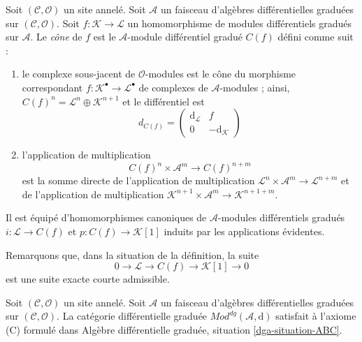 \begin{definition}
\label{definition-cone}
Soit $(\mathcal{C}, \mathcal{O})$ un site annelé.
Soit $\mathcal{A}$ un faisceau d'algèbres différentielles graduées sur $(\mathcal{C}, \mathcal{O})$.
Soit $f : \mathcal{K} \to \mathcal{L}$ un homomorphisme de modules différentiels gradués sur $\mathcal{A}$.
Le {\it cône} de $f$ est le $\mathcal{A}$-module différentiel gradué $C(f)$ défini comme suit :
\begin{enumerate}
\item le complexe sous-jacent de $\mathcal{O}$-modules est le cône du morphisme correspondant $f : \mathcal{K}^\bullet \to \mathcal{L}^\bullet$ de complexes de $\mathcal{A}$-modules ; ainsi, $C(f)^n = \mathcal{L}^n \oplus \mathcal{K}^{n + 1}$ et le différentiel est
$$
d_{C(f)} =
\left(
\begin{matrix}
\text{d}_\mathcal{L} & f \\
0 & -\text{d}_\mathcal{K}
\end{matrix}
\right)
$$
\item l'application de multiplication
$$
C(f)^n \times \mathcal{A}^m \to C(f)^{n + m}
$$
est la somme directe de l'application de multiplication $\mathcal{L}^n \times \mathcal{A}^m \to \mathcal{L}^{n + m}$ et de l'application de multiplication $\mathcal{K}^{n + 1} \times \mathcal{A}^m \to \mathcal{K}^{n + 1 + m}$.
\end{enumerate}
Il est équipé d'homomorphismes canoniques de $\mathcal{A}$-modules différentiels gradués $i : \mathcal{L} \to C(f)$ et $p : C(f) \to \mathcal{K}[1]$ induits par les applications évidentes.
\end{definition}

\noindent
Remarquons que, dans la situation de la définition, la suite
$$
0 \to \mathcal{L} \to C(f) \to \mathcal{K}[1] \to 0
$$
est une suite exacte courte admissible.

\begin{lemma}
\label{lemma-axiom-C}
Soit $(\mathcal{C}, \mathcal{O})$ un site annelé.
Soit $\mathcal{A}$ un faisceau d'algèbres différentielles graduées sur $(\mathcal{C}, \mathcal{O})$.
La catégorie différentielle graduée $\textit{Mod}^{dg}(\mathcal{A}, \text{d})$ satisfait à l'axiome (C) formulé dans Algèbre différentielle graduée, situation \ref{dga-situation-ABC}.
\end{lemma}


